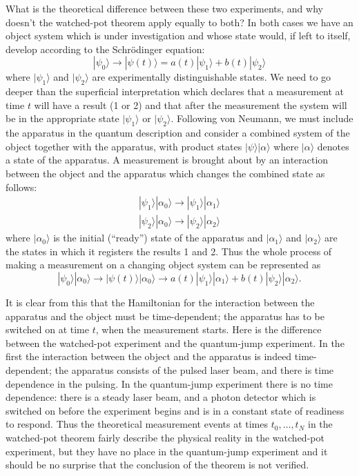 \documentclass[12pt,a4paper,reqno]{article}
\renewcommand{\(}{\left(}
\renewcommand{\)}{\right)}
\newcommand{\<}{\langle}
\renewcommand{\>}{\rangle}
\theoremstyle{plain} %
\theoremstyle{definition}
\theoremstyle{remark}
\begin{document}
What is the theoretical difference between these two experiments, and 
why doesn't the watched-pot theorem apply equally to both? In both cases 
we have an object system which is under investigation and whose state 
would, if left to itself, develop according to the Schr\"odinger equation:
\[
|\psi_0\> \rightarrow |\psi (t)\> = a(t)|\psi_1\> + b(t)|\psi_2\>
\] 
where $|\psi_1\> $ and $|\psi_2\> $ are experimentally distinguishable 
states. We need to go deeper than the superficial interpretation which 
declares that a measurement at time $t$ will have a result (1 or 2) and 
that after the measurement the system will be in the appropriate state 
$|\psi_1\> $ or $|\psi_2\> $. Following von Neumann, we must include 
the apparatus in the quantum description and consider a combined system 
of the object together with the apparatus, with product states $|\psi\> 
|\alpha \> $ where $|\alpha \> $ denotes a state of the apparatus. A 
measurement is brought about by an interaction between the object and 
the apparatus which changes the combined state as follows:
\begin{eqnarray*}
|\psi _1\> |\alpha _0\> \rightarrow |\psi _1\> |\alpha 
_1\> \\
|\psi _2\> |\alpha _0\> \rightarrow |\psi _2\> |\alpha 
_2\> \end{eqnarray*}
where $|\alpha _0\> $ is the initial (``ready'') state of the apparatus 
and $|\alpha _1\> $ and $|\alpha _2\> $ are the states in which 
it registers the results 1 and 2. Thus the whole process of making a measurement 
on a changing object system can be represented as 
\[ 
|\psi_0\> |\alpha_0\> \rightarrow |\psi(t)\> |\alpha_0\> 
\rightarrow a(t)|\psi_1\> |\alpha_1\>  + b(t)|\psi_2\> |\alpha_2\> . 
\]

It is clear from this that the Hamiltonian for the interaction 
between the apparatus and the object must be time-dependent; the apparatus 
has to be switched on at time $t$, when the measurement starts. Here is 
the difference between the watched-pot experiment and the quantum-jump 
experiment. In the first the interaction between the object and the apparatus 
is indeed time-dependent; the apparatus consists of the pulsed laser beam, 
and there is time dependence in the pulsing. In the quantum-jump experiment 
there is no time dependence: there is a steady laser beam, and a photon 
detector which is switched on before the experiment begins and is in a 
constant state of readiness to respond. Thus the theoretical measurement 
events at times $t_0, \ldots , t_N$ in the watched-pot theorem fairly 
describe the physical reality in the watched-pot experiment, but they 
have no place in the quantum-jump experiment and it should be no surprise 
that the conclusion of the theorem is not verified. 
\end{document}
